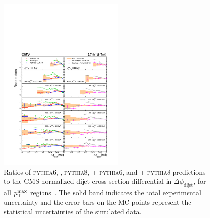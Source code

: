 \documentclass{PoS}
\providecommand{\dphi}{\ensuremath{\Delta\phi_\text{dijet}}\xspace}
\providecommand{\ptmax}{\ensuremath{\pt^{\text{max}}}\xspace}
\providecommand{\PYTHIAS} {{\textsc{pythia6}}\xspace}
\providecommand{\PYTHIAE} {{\textsc{pythia8}}\xspace}
\begin{document}
\begin{figure}[hbtp]
  \centering
  \includegraphics[width=0.55\textwidth]{Figure8.pdf}
  \caption{Ratios of \PYTHIAS, \HERWIGpp, \PYTHIAE, \MADGRAPH + \PYTHIAS, and
    \POWHEG + \PYTHIAE predictions to the CMS normalized dijet cross
    section differential in \dphi, for all \ptmax regions~\cite{Khachatryan:2016hkr}.
    The solid band indicates the total experimental uncertainty and
    the error bars on the MC points represent the statistical
    uncertainties of the simulated data.}
  \label{fig:dijet_ratios_MC_data}
\end{figure}
\end{document}
